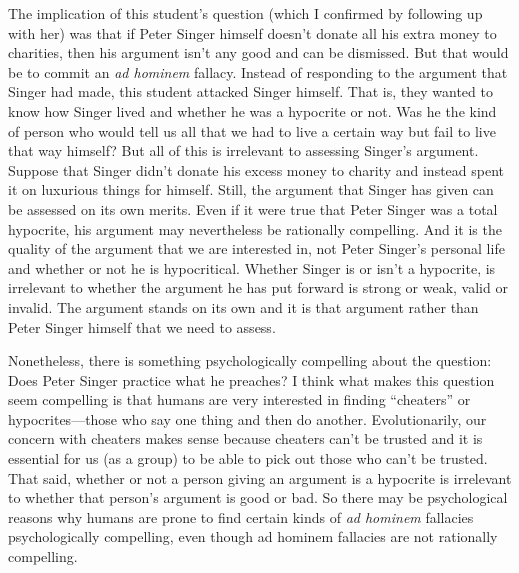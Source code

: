 The implication of this student's question (which I confirmed by following up with her) was that if Peter Singer himself doesn't donate all his extra money to charities, then his argument isn't any good and can be dismissed. But that would be to commit an \textit{ad hominem} fallacy. Instead of responding to the argument that Singer had made, this student attacked Singer himself. That is, they wanted to know how Singer lived and whether he was a hypocrite or not. Was he the kind of person who would tell us all that we had to live a certain way but fail to live that way himself? But all of this is irrelevant to assessing Singer's argument. Suppose that Singer didn't donate his excess money to charity and instead spent it on luxurious things for himself. Still, the argument that Singer has given can be assessed on its own merits. Even if it were true that Peter Singer was a total hypocrite, his argument may nevertheless be rationally compelling. And it is the quality of the argument that we are interested in, not Peter Singer's personal life and whether or not he is hypocritical. Whether Singer is or isn't a hypocrite, is irrelevant to whether the argument he has put forward is strong or weak, valid or invalid. The argument stands on its own and it is that argument rather than Peter Singer himself that we need to assess. 

Nonetheless, there is something psychologically compelling about the question: Does Peter Singer practice what he preaches? I think what makes this question seem compelling is that humans are very interested in finding ``cheaters'' or hypocrites---those who say one thing and then do another. Evolutionarily, our concern with cheaters makes sense because cheaters can't be trusted and it is essential for us (as a group) to be able to pick out those who can't be trusted. That said, whether or not a person giving an argument is a hypocrite is irrelevant to whether that person's argument is good or bad. So there may be psychological reasons why humans are prone to find certain kinds of \textit{ad hominem} fallacies psychologically compelling, even though ad hominem fallacies are not rationally compelling.

